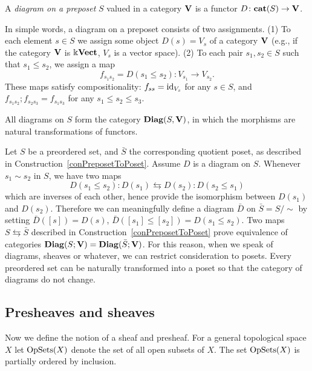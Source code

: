 \begin{defin}\label{definDiagramOnPoset}
A \emph{diagram on a preposet} $S$ valued in a category $\mathbf{V}$ is a functor $D\colon \mathbf{cat}(S)\to \mathbf{V}$. %
\end{defin}

\begin{rem}\label{remDiagramInformally}
In simple words, a diagram on a preposet consists of two assignments. (1) To each element $s\in S$ we assign some object $D(s)=V_s$ of a category $\mathbf{V}$ (e.g., if the category $\mathbf{V}$ is $\Bbbk\mathbf{Vect}$, $V_s$ is a vector space). (2) To each pair $s_1,s_2\in S$ such that $s_1\leq s_2$, we assign a map
\[
f_{s_1s_2}=D(s_1\leq s_2)\colon V_{s_1}\to V_{s_2}.
\]
These maps satisfy compositionality: $f_{ss}=\operatorname{id}_{V_s}$ for any $s\in S$, and $f_{s_1s_2};f_{s_2s_3}=f_{s_1s_3}$ for any $s_1\leq s_2\leq s_3$.
\end{rem}

All diagrams on $S$ form the category $\mathbf{Diag}(S,\mathbf{V})$, in which the morphisms are natural transformations of functors.

\begin{rem}\label{remPreposetsNotNeeded}
Let $S$ be a preordered set, and $\bar{S}$ the corresponding quotient poset, as described in Construction~\ref{conPreposetToPoset}. Assume $D$ is a diagram on $S$. Whenever $s_1\sim s_2$ in $S$, we have two maps
\[
D(s_1\leq s_2)\colon D(s_1)\leftrightarrows D(s_2)\colon D(s_2\leq s_1)
\]
which are inverses of each other, hence provide the isomorphism between $D(s_1)$ and $D(s_2)$. Therefore we can meaningfully define a diagram $\bar{D}$ on $\bar{S}=S/\sim$ by setting $\bar{D}([s])=D(s)$, $\bar{D}([s_1]\leq [s_2])=D(s_1\leq s_2)$. Two maps $S\leftrightarrows \bar{S}$ described in Construction~\ref{conPreposetToPoset} prove equivalence of categories $\mathbf{Diag}(S;\mathbf{V})=\mathbf{Diag}(\bar{S};\mathbf{V})$. For this reason, when we speak of diagrams, sheaves or whatever, we can restrict consideration to posets. Every preordered set can be naturally transformed into a poset so that the category of diagrams do not change.
\end{rem}

\subsection{Presheaves and sheaves} 
Now we define the notion of a sheaf and presheaf. For a general topological space $X$ let $\operatorname{OpSets}(X)$ denote the set of all open subsets of $X$. The set $\operatorname{OpSets}(X)$ is partially ordered by inclusion.

